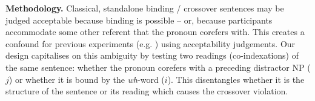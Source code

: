 \documentclass[12pt,letterpaper]{article}
\newcommand{\sectitle}[1]{\smallskip \textbf{#1.}}
\begin{document}

\sectitle{Methodology} %
Classical, standalone binding / crossover sentences may be judged acceptable because binding is possible -- or, because participants accommodate some other referent that the pronoun corefers with. This creates a confound for previous experiments (e.g. \citealt{kush_respecting_2013}) using acceptability judgements. 
Our design capitalises on this ambiguity by testing two readings (co-indexations) of the same sentence: whether the pronoun corefers with a preceding distractor NP ($j$) or whether it is bound by the \emph{wh}-word ($i$). This disentangles whether it is the structure of the sentence or its reading which causes the crossover violation.
\end{document}
